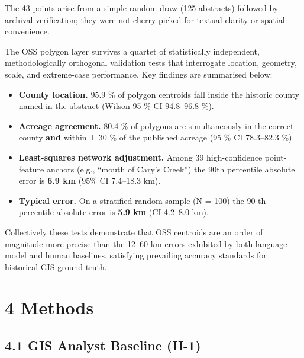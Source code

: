 \documentclass[
  10pt,
  twocolumn]{article}
\providecommand{\tightlist}{%
  \setlength{\itemsep}{0pt}\setlength{\parskip}{0pt}}
\begin{document}
The 43 points arise from a simple random draw (125 abstracts) followed
by archival verification; they were not cherry-picked for textual
clarity or spatial convenience.

The OSS polygon layer survives a quartet of statistically independent,
methodologically orthogonal validation tests that interrogate location,
geometry, scale, and extreme-case performance. Key findings are
summarised below:

\begin{itemize}
\tightlist
\item
  \textbf{County location.} 95.9 \% of polygon centroids fall inside the
  historic county named in the abstract (Wilson 95 \% CI 94.8--96.8 \%).
\item
  \textbf{Acreage agreement.} 80.4 \% of polygons are simultaneously in
  the correct county \textbf{and} within ± 30 \% of the published
  acreage (95 \% CI 78.3--82.3 \%).
\item
  \textbf{Least-squares network adjustment.} Among 39 high-confidence
  point-feature anchors (e.g., ``mouth of Cary's Creek'') the 90th
  percentile absolute error is \textbf{6.9 km} (95\% CI 7.4--18.3 km).
\item
  \textbf{Typical error.} On a stratified random sample (N = 100) the
  90-th percentile absolute error is \textbf{5.9 km} (CI 4.2--8.0 km).
\end{itemize}

Collectively these tests demonstrate that OSS centroids are an order of
magnitude more precise than the 12--60 km errors exhibited by both
language-model and human baselines, satisfying prevailing accuracy
standards for historical-GIS ground truth.

\section{4 Methods}\label{methods}

\subsection{4.1 GIS Analyst Baseline
(H-1)}\label{gis-analyst-baseline-h-1}
\end{document}
